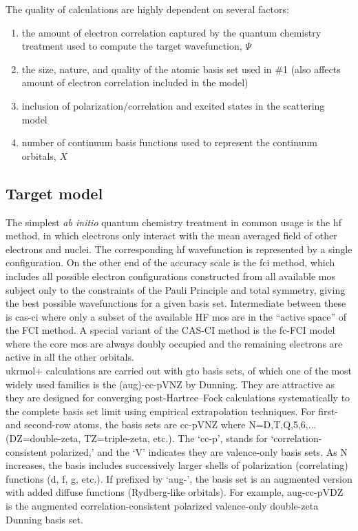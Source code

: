 \documentclass[12pt]{article}
\begin{document}
The quality of \rmat{} calculations are highly dependent on several factors:
\begin{enumerate}
		\item the amount of electron correlation captured by the quantum chemistry
				treatment used to compute the target wavefunction, $\Psi$
		\item the size, nature, and quality of the atomic basis set used in \#1 (also
				affects amount of electron correlation included in the model)
		\item inclusion of polarization/correlation and excited states in the 
				scattering model
		\item number of continuum basis functions used to represent the continuum
				orbitals, $X$
\end{enumerate}

\subsection{Target model}

The simplest \textit{ab initio} quantum chemistry
treatment in common usage is the \ac{hf} method,
in which electrons only interact with the mean averaged field
of other electrons and nuclei. The corresponding \ac{hf} wavefunction
is represented by a single configuration. On the other
end of the accuracy scale is the \ac{fci}
method, which includes all possible electron configurations
constructed from all available \acp{mo}
subject only to the constraints of the Pauli Principle and total
symmetry, giving the best possible wavefunctions for a given
basis set. Intermediate between these is
\ac{cas}-\ac{ci} where only
a subset of the available HF \acp{mo} are in the ``active space'' 
of the FCI method. A
special variant of the CAS-CI method is the \ac{fc}-FCI
model where the core \acp{mo} are always
doubly occupied and the remaining electrons are active in all
the other orbitals. \\

\ac{ukrmol+} calculations are carried out with \ac{gto} 
basis sets, of which one of the most widely used families
is the (aug)-cc-pVNZ by Dunning.\cite{dunning1989} They are attractive as they are designed for 
converging post-Hartree–Fock calculations systematically to the complete basis set limit using empirical extrapolation techniques.
For first- and second-row atoms, the basis sets are cc-pVNZ where N=D,T,Q,5,6,... (DZ=double-zeta, TZ=triple-zeta, etc.). 
The `cc-p', stands for `correlation-consistent polarized,' and the `V' indicates they are valence-only basis sets. 
As N increases, the basis includes successively larger shells of polarization (correlating) functions (d, f, g, etc.). 
If prefixed by `aug-', the basis set is an augmented version with added diffuse functions (Rydberg-like orbitals).
For example, aug-cc-pVDZ is the augmented correlation-consistent polarized valence-only double-zeta Dunning basis set.\\
\end{document}
